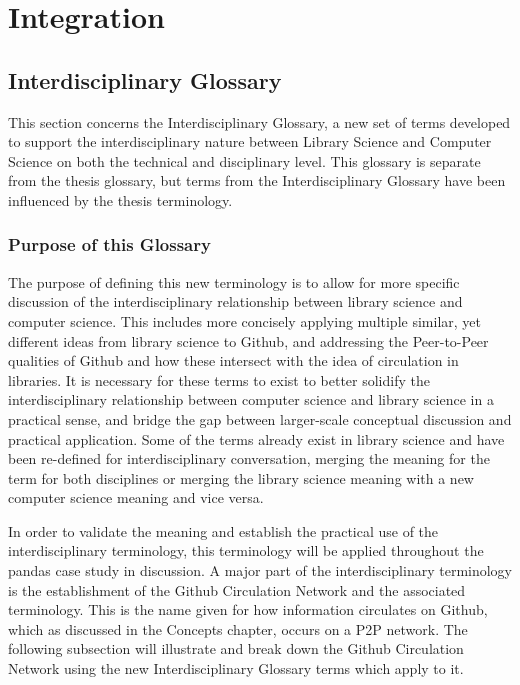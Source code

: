 \chapter{Integration} 
\label{ch:integration}

\section{Interdisciplinary Glossary}

This section concerns the Interdisciplinary Glossary, a new set of terms developed to support the interdisciplinary nature between Library Science and Computer Science on both the technical and disciplinary level. This glossary is separate from the thesis glossary, but terms from the Interdisciplinary Glossary have been influenced by the thesis terminology. 

\subsection{Purpose of this Glossary}

The purpose of defining this new terminology is to allow for more specific discussion of the interdisciplinary relationship between library science and computer science. This includes more concisely applying multiple similar, yet different ideas from library science to Github, and addressing the Peer-to-Peer qualities of Github and how these intersect with the idea of circulation in libraries. It is necessary for these terms to exist to better solidify the interdisciplinary relationship between computer science and library science in a practical sense, and bridge the gap between larger-scale conceptual discussion and practical application. Some of the terms already exist in library science and have been re-defined for interdisciplinary conversation, merging the meaning for the term for both disciplines or merging the library science meaning with a new computer science meaning and vice versa. 

In order to validate the meaning and establish the practical use of the interdisciplinary terminology, this terminology will be applied throughout the pandas case study in discussion. A major part of the interdisciplinary terminology is the establishment of the Github Circulation Network and the associated terminology. This is the name given for how information circulates on Github, which as discussed in the Concepts chapter, occurs on a P2P network. The following subsection will illustrate and break down the Github Circulation Network using the new Interdisciplinary Glossary terms which apply to it. 

